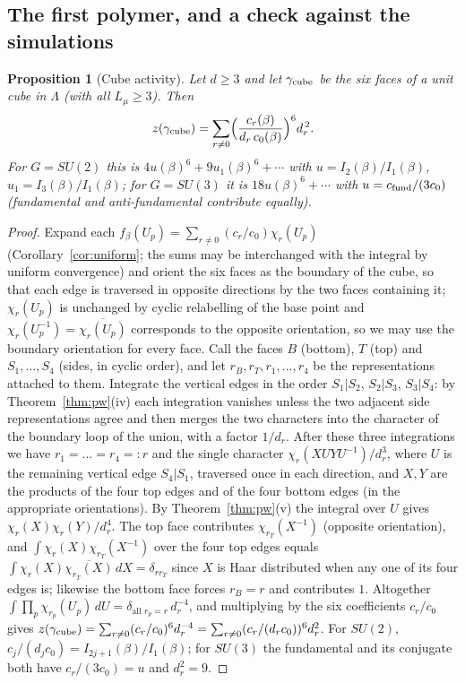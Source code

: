 \documentclass[11pt,a4paper]{article}
\newtheorem{proposition}[theorem]{Proposition}
\theoremstyle{definition}
\theoremstyle{remark}
\newcommand{\dU}{\,dU}
\begin{document}
\subsection{The first polymer, and a check against the simulations}

\begin{proposition}[Cube activity]\label{prop:cube}
Let $d\ge3$ and let $\gamma_{\rm cube}$ be the six faces of a unit cube in $\Lambda$ (with all $L_\mu\ge3$). Then
\[
z(\gamma_{\rm cube})=\sum_{r\neq0}\Bigl(\frac{c_r(\beta)}{d_r\,c_0(\beta)}\Bigr)^{6}d_r^{\,2}.
\]
For $G=SU(2)$ this is $4u(\beta)^6+9u_1(\beta)^6+\cdots$ with $u=I_2(\beta)/I_1(\beta)$, $u_1=I_3(\beta)/I_1(\beta)$;
for $G=SU(3)$ it is $18u(\beta)^6+\cdots$ with $u=c_{\rm fund}/(3c_0)$ (fundamental and anti-fundamental contribute equally).
\end{proposition}

\begin{proof}
Expand each $f_\beta(U_p)=\sum_{r\ne0}(c_r/c_0)\chi_r(U_p)$ (Corollary~\ref{cor:uniform}; the sums may be interchanged
with the integral by uniform convergence) and orient the six faces as the boundary of the cube, so that each edge is
traversed in opposite directions by the two faces containing it; $\chi_r(U_p)$ is unchanged by cyclic relabelling of the
base point and $\chi_r(U_p^{-1})=\overline{\chi_r(U_p)}$ corresponds to the opposite orientation, so we may use the boundary
orientation for every face. Call the faces $B$ (bottom), $T$ (top) and $S_1,\dots,S_4$ (sides, in cyclic order), and let
$r_B,r_T,r_1,\dots,r_4$ be the representations attached to them. Integrate the vertical edges in the order
$S_1|S_2$, $S_2|S_3$, $S_3|S_4$: by Theorem~\ref{thm:pw}(iv) each integration vanishes unless the two adjacent side
representations agree and then merges the two characters into the character of the boundary loop of the union, with a
factor $1/d_r$. After these three integrations we have $r_1=\dots=r_4=:r$ and the single character
$\chi_r(XUYU^{-1})/d_r^3$, where $U$ is the remaining vertical edge $S_4|S_1$, traversed once in each direction, and $X,Y$ are the
products of the four top edges and of the four bottom edges (in the appropriate orientations). By
Theorem~\ref{thm:pw}(v) the integral over $U$ gives $\chi_r(X)\chi_r(Y)/d_r^4$. The top face contributes $\chi_{r_T}(X^{-1})$
(opposite orientation), and $\int\chi_r(X)\chi_{r_T}(X^{-1})$ over the four top edges equals $\int\chi_r(X)\overline{\chi_{r_T}(X)}\,dX=\delta_{r r_T}$
since $X$ is Haar distributed when any one of its four edges is; likewise the bottom face forces $r_B=r$ and contributes $1$.
Altogether $\int\prod_{p}\chi_{r_p}(U_p)\dU=\delta_{\text{all }r_p=r}\,d_r^{-4}$, and multiplying by the six coefficients
$c_r/c_0$ gives $z(\gamma_{\rm cube})=\sum_{r\ne0}(c_r/c_0)^6d_r^{-4}=\sum_{r\ne0}(c_r/(d_rc_0))^6d_r^{2}$.
For $SU(2)$, $c_j/(d_jc_0)=I_{2j+1}(\beta)/I_1(\beta)$; for $SU(3)$ the fundamental and its conjugate both have
$c_r/(3c_0)=u$ and $d_r^2=9$.
\end{proof}
\end{document}
